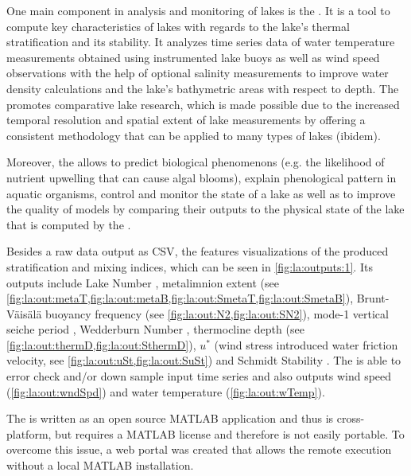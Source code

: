 One main component in analysis and monitoring of lakes is the \la \citep{read2011derivation}. It is a tool to compute key characteristics of lakes with regards to the lake's thermal stratification and its stability. It analyzes time series data of water temperature measurements obtained using instrumented lake buoys as well as wind speed observations with the help of optional salinity measurements to improve water density calculations and the lake's bathymetric areas with respect to depth. The \la promotes comparative lake research, which is made possible due to the increased temporal resolution and spatial extent of lake measurements by offering a consistent methodology that can be applied to many types of lakes (ibidem).

Moreover, the \la allows to predict biological phenomenons (e.g. the likelihood of nutrient upwelling that can cause algal blooms), explain phenological pattern in aquatic organisms, control and monitor the state of a lake as well as to improve the quality of models by comparing their outputs to the physical state of the lake that is computed by the \la.



Besides a raw data output as \ac{CSV}, the \la features visualizations of the produced stratification and mixing indices, which can be seen in \cref{fig:la:outputs:1}. Its outputs include Lake Number \citep[see \cref{fig:la:out:Ln,fig:la:out:SLn},][]{imberger1990}, metalimnion extent (see \cref{fig:la:out:metaT,fig:la:out:metaB,fig:la:out:SmetaT,fig:la:out:SmetaB}), Brunt-Väisälä buoyancy frequency (see \cref{fig:la:out:N2,fig:la:out:SN2}), mode-1 vertical seiche period \citep[see \cref{fig:la:out:T1,fig:la:out:ST1},][]{monismith1986}, Wedderburn Number \citep[see \cref{fig:la:out:W,fig:la:out:SW},][]{thompson1980}, thermocline depth (see \cref{fig:la:out:thermD,fig:la:out:SthermD}), $u^{*}$ (wind stress introduced water friction velocity, see \cref{fig:la:out:uSt,fig:la:out:SuSt}) and Schmidt Stability \citep[see \cref{fig:la:out:St},][]{schmidt1928,hutchinson1957,idso1973}. The \la is able to error check and/or down sample input time series and also outputs wind speed (\cref{fig:la:out:wndSpd}) and water temperature (\cref{fig:la:out:wTemp}).

The \la is written as an open source MATLAB application and thus is cross-platform, but requires a MATLAB license and therefore is not easily portable. To overcome this issue, a web portal \citep{laweb} was created that allows the remote \la execution without a local MATLAB installation.

